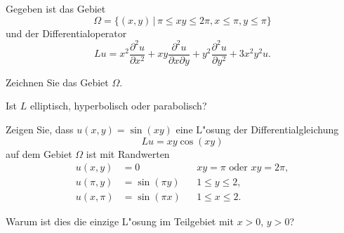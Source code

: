 Gegeben ist das Gebiet
\[
\Omega=\{
(x,y)\,|\,\pi\le xy\le 2\pi, x\le \pi,y\le \pi
\}
\]
und der Differentialoperator
\[
Lu=
x^2\frac{\partial^2u}{\partial x^2}
+xy\frac{\partial^2u}{\partial x\partial y}
+y^2\frac{\partial^2u}{\partial y^2}
+3x^2y^2u.
\]
\begin{teilaufgaben}
\item Zeichnen Sie das Gebiet $\Omega$.
\item Ist $L$ elliptisch, hyperbolisch oder parabolisch?
\item Zeigen Sie, dass $u(x,y)=\sin(xy)$ eine L"osung der
Differentialgleichung
\[
Lu=xy\cos(xy)
\]
auf dem Gebiet $\Omega$ ist mit Randwerten
\begin{align*}
u(x,y)&=0            &&\text{$xy=\pi$ oder $xy=2\pi$},\\
u(\pi,y)&=\sin(\pi y)&&1\le y\le 2,\\
u(x,\pi)&=\sin(\pi x)&&1\le x\le 2.
\end{align*}
\item Warum ist dies die einzige L"osung im Teilgebiet mit $x>0$, $y>0$?
\end{teilaufgaben}

